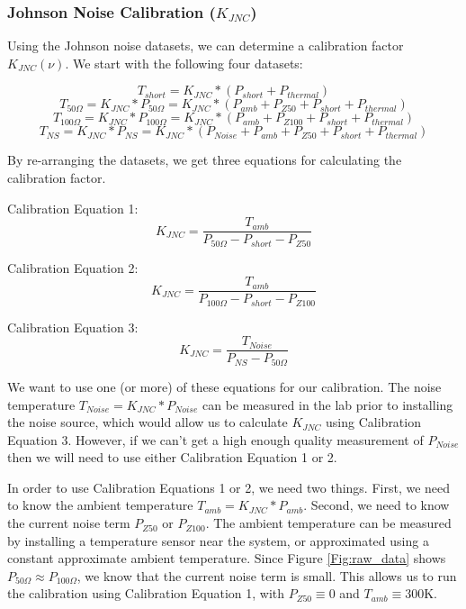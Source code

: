 \subsubsection{Johnson Noise Calibration ($K_{JNC}$)}

Using the Johnson noise datasets, we can determine a calibration factor $K_{JNC}(\nu)$. We start with the following four datasets:

\begin{equation}
T_{short} = K_{JNC}*(P_{short}+P_{thermal})
\end{equation}
\begin{equation}
T_{50 \Omega} = K_{JNC}*P_{50 \Omega} = K_{JNC}*(P_{amb} + P_{Z50} + P_{short}+P_{thermal})
\end{equation}
\begin{equation}
T_{100 \Omega} = K_{JNC}*P_{100 \Omega} = K_{JNC}*(P_{amb} + P_{Z100}+P_{short}+P_{thermal})
\end{equation}
\begin{equation}
T_{NS} = K_{JNC}*P_{NS} = K_{JNC}*(P_{Noise}+P_{amb}+P_{Z50}+P_{short}+P_{thermal})
\end{equation}

By re-arranging the datasets, we get three equations for calculating the calibration factor.

Calibration Equation 1:
\begin{equation}
K_{JNC} = \frac{T_{amb}}{P_{50 \Omega} - P_{short} - P_{Z50}}
\end{equation}

Calibration Equation 2:
\begin{equation}
K_{JNC} = \frac{T_{amb}}{P_{100 \Omega} - P_{short}-P_{Z100}}
\end{equation}

Calibration Equation  3:
\begin{equation}
K_{JNC} = \frac{T_{Noise}}{P_{NS}-P_{50 \Omega}}
\end{equation}

We want to use one (or more) of these equations for our calibration. The noise temperature $T_{Noise}= K_{JNC}*P_{Noise}$ can be measured in the lab prior to installing the noise source, which would allow us to calculate $K_{JNC}$ using Calibration Equation 3. However, if we can't get a high enough quality measurement of $P_{Noise}$ then we will need to use either Calibration Equation 1 or 2. 

In order to use Calibration Equations 1 or 2, we need two things. First, we need to know the ambient temperature $T_{amb} = K_{JNC}*P_{amb}$. Second, we need to know the current noise term $P_{Z50}$ or $P_{Z100}$. The ambient temperature can be measured by installing a temperature sensor near the system, or approximated using a constant approximate ambient temperature. Since Figure \ref{Fig:raw_data} shows $P_{50 \Omega} \approx P_{100 \Omega}$, we know that the current noise term is small. This allows us to run the calibration using Calibration Equation 1, with $P_{Z50} \equiv 0$ and $T_{amb} \equiv 300$K. 

